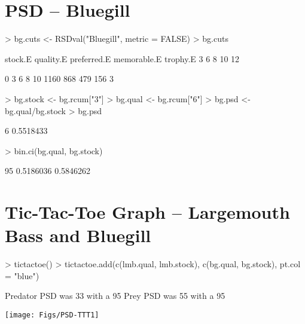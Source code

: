 \documentclass[a4paper]{article}
\begin{document}
\section{PSD -- Bluegill}
\begin{Schunk}
\begin{Sinput}
> bg.cuts <- RSDval("Bluegill", metric = FALSE)
> bg.cuts
\end{Sinput}
\begin{Soutput}
    stock.E   quality.E preferred.E memorable.E    trophy.E
          3           6           8          10          12
\end{Soutput}
\begin{Soutput}
   0    3    6    8   10
1160  868  479  156    3
\end{Soutput}
\begin{Sinput}
> bg.stock <- bg.rcum["3"]
> bg.qual <- bg.rcum["6"]
> bg.psd <- bg.qual/bg.stock
> bg.psd
\end{Sinput}
\begin{Soutput}
        6
0.5518433
\end{Soutput}
\begin{Sinput}
> bin.ci(bg.qual, bg.stock)
\end{Sinput}
\begin{Soutput}
  95% LCI   95% UCI
0.5186036 0.5846262
\end{Soutput}
\end{Schunk}


\section{Tic-Tac-Toe Graph -- Largemouth Bass and Bluegill}
\begin{Schunk}
\begin{Sinput}
> tictactoe()
> tictactoe.add(c(lmb.qual, lmb.stock), c(bg.qual, bg.stock), pt.col = "blue")
\end{Sinput}
\begin{Soutput}
Predator PSD was 33 with a 95% CI of (29.4,36.2).
Prey PSD was 55 with a 95% CI of (51.8,58.5).
\end{Soutput}
\end{Schunk}
\texttt{[image: Figs/PSD-TTT1]}
\end{document}
